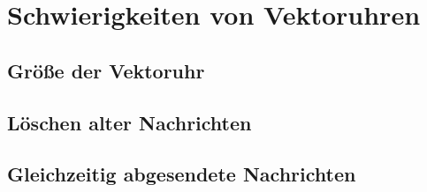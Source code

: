 \section{Schwierigkeiten von Vektoruhren}
\subsection{Größe der Vektoruhr}
\subsection{Löschen alter Nachrichten}
\subsection{Gleichzeitig abgesendete Nachrichten}
